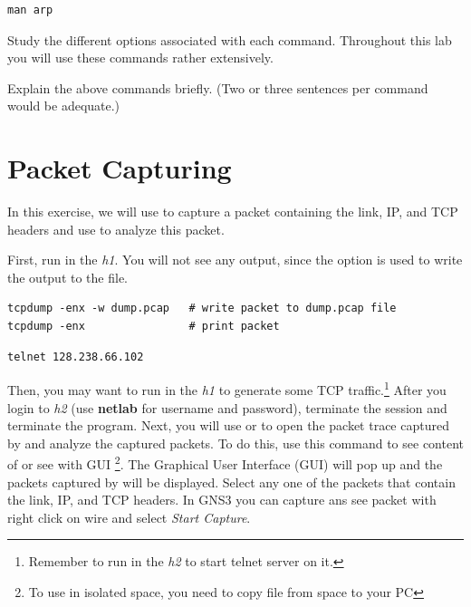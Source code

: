 \documentclass{../UTNetLab}
\begin{document}
\begin{lstlisting}
man arp
\end{lstlisting}

Study the different options associated with each command.
Throughout this lab you will use these commands rather extensively.

\begin{report}
    \item Explain the above commands briefly.
    (Two or three sentences per command would be adequate.)
\end{report}

\section{Packet Capturing}
In this exercise, we will use  to capture a packet containing the link, IP, and TCP headers and use  to analyze this packet.

First, run  in the \textit{h1}.
You will not see any  output, since the  option is used to write the output to the  file.

\begin{lstlisting}[emph={dump,pcap}]
tcpdump -enx -w dump.pcap   # write packet to dump.pcap file
tcpdump -enx                # print packet
\end{lstlisting}

\begin{lstlisting}
telnet 128.238.66.102
\end{lstlisting}

Then, you may want to run  in the \textit{h1} to generate some TCP traffic.\footnote{Remember to run  in the \textit{h2} to start telnet server on it.}
After you login to \textit{h2} (use \textbf{netlab} for username and password), terminate the  session and terminate the  program.
Next, you will use  or  to open the packet trace captured by  and analyze the captured packets.
To do this, use this command  to see content of  or see with GUI \footnote{To use  in isolated  space, you need to copy file from   space to your PC}.
The  Graphical User Interface (GUI) will pop up and the packets captured by  will be displayed.
Select any one of the packets that contain the link, IP, and TCP headers.
In GNS3 you can capture ans see packet with right click on wire and select \textit{Start Capture}.
\end{document}
